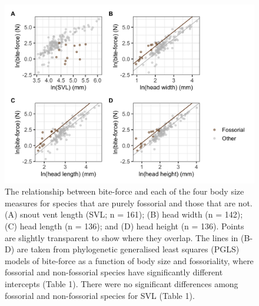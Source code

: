 \documentclass[a4paper, 12pt]{article}
\begin{document}
\newpage
\begin{figure}[h]
 \centering
  \includegraphics[width = \linewidth]{figures/bodysize-bite-force-fossorial.png}
  \caption{The relationship between bite-force and each of the four body size measures for species that are purely fossorial and those that are not. 
  (A) snout vent length (SVL; n = 161); (B) head width (n = 142); (C) head length (n = 136); and (D) head height (n = 136). 
  Points are slightly transparent to show where they overlap. 
  The lines in (B-D) are taken from phylogenetic generalised least squares (PGLS) models of bite-force as a function of body size and fossoriality, where fossorial and non-fossorial species have significantly different intercepts (Table 1). 
  There were no significant differences among fossorial and non-fossorial species for SVL (Table 1). 
}
  \label{fig-fossorial}
\end{figure}

\newpage
\begin{landscape}
  
\end{landscape}



\end{document}
